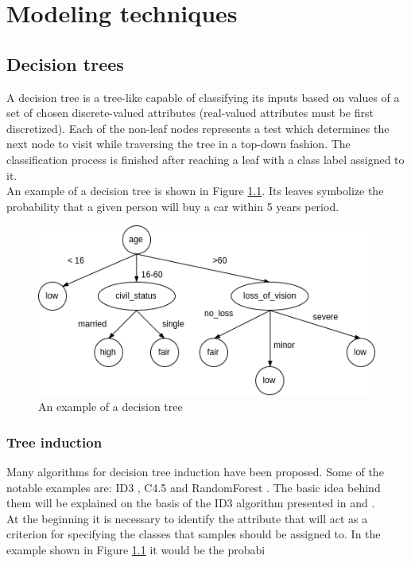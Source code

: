 \documentclass[11pt,oneside, a4paper]{report}
\begin{document}
\chapter{Modeling techniques}

\section{Decision trees}
A decision tree is a tree-like capable of classifying its inputs based on values of a set of chosen discrete-valued attributes (real-valued attributes must be first discretized). Each of the non-leaf nodes represents a test which determines the next node to visit while traversing the tree in a top-down fashion. The classification process is finished after reaching a leaf with a class label assigned to it.
\\
An example of a decision tree is shown in Figure \ref{fig:decision-tree}. Its leaves symbolize the probability that a given person will buy a car within  5 years period.

\begin{figure}[htp]
\centering
\includegraphics[scale=0.70]{figures/decision-tree.png}
\caption{An example of a decision tree}
\label{fig:decision-tree}
\end{figure}

\subsection{Tree induction}
Many algorithms for decision tree induction have been proposed. Some of the notable examples are: ID3 \cite{QUINLAN1986}, C4.5 \cite{QUINLAN1993} and RandomForest \cite{HO1995}. The basic idea behind them will be explained on the basis of the ID3 algorithm presented in \cite{HAN2005} and \cite{QUINLAN1986}.
\\
At the beginning it is necessary to identify the attribute that will act as a criterion for specifying the classes that samples should be assigned to. In the example shown in Figure \ref{fig:decision-tree} it would be the probabi 
\end{document}
